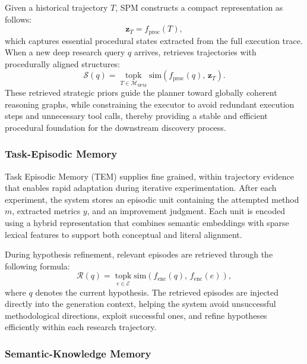 Given a historical trajectory $T$, SPM constructs a compact representation as follows:
\begin{equation}
\mathbf{z}_{T} = f_{\text{proc}}(T),
\end{equation}
which captures essential procedural states extracted from the full execution trace.  
When a new deep research query $q$ arrives, {\ProjectName} retrieves trajectories with procedurally aligned structures:
\begin{equation}
\mathcal{S}(q) =
\operatorname*{topk}_{T \in \mathcal{M}_{\text{SPM}}}
\mathrm{sim}\!\left( f_{\text{proc}}(q),\, \mathbf{z}_T \right).
\end{equation}
These retrieved strategic priors guide the planner toward globally coherent reasoning graphs, while constraining the executor to avoid redundant execution steps and unnecessary tool calls, thereby providing a stable and efficient procedural foundation for the downstream discovery process.

\subsubsection{Task-Episodic Memory}
Task Episodic Memory (TEM) supplies fine grained, within trajectory evidence that enables rapid adaptation during iterative experimentation. After each experiment, the system stores an episodic unit containing the attempted method $m$, extracted metrics $y$, and an improvement judgment. Each unit is encoded using a hybrid representation that combines semantic embeddings with sparse lexical features to support both conceptual and literal alignment.

During hypothesis refinement, relevant episodes are retrieved through the following formula:
\begin{equation}
\mathcal{R}(q) =
\operatorname*{topk}_{e \in \mathcal{E}}
\mathrm{sim}\!\left( f_{\text{enc}}(q),\, f_{\text{enc}}(e) \right),
\end{equation}
where $q$ denotes the current hypothesis.  
The retrieved episodes are injected directly into the generation context, helping the system avoid unsuccessful methodological directions, exploit successful ones, and refine hypotheses efficiently within each research trajectory.

\subsubsection{Semantic-Knowledge Memory}

